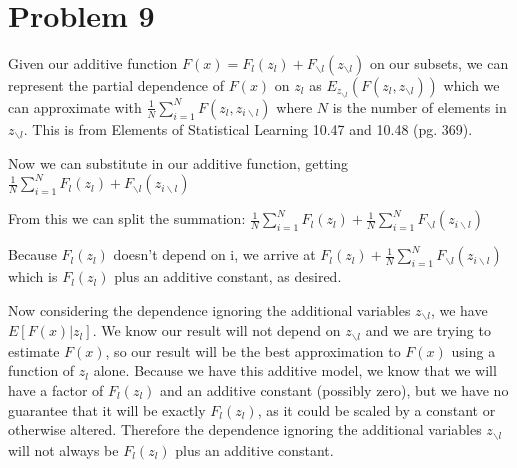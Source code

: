 \documentclass[11pt]{article}
\begin{document}
\begin{center}

\ \\
\end{center}


\section*{Problem 9}

\vspace{5 mm}
\noindent
Given our additive function $F(x) = F_{l}(z_{l}) + F_{\backslash l}(z_{\backslash l})$
 on our subsets, we can represent the partial dependence of $F(x)$ on $z_{l}$ as
  $E_{z_{\backslash l}}(F(z_{l}, z_{\backslash l}))$ which we can approximate with 
  $\frac{1}{N} \sum\limits_{i=1}^N F(z_{l}, z_{i\backslash l})$ where $N$ is the
   number of elements in $z_{\backslash l}$.  This is from Elements of Statistical
    Learning 10.47 and 10.48 (pg. 369).  

\noindent
Now we can substitute in our additive function, getting 
$\frac{1}{N} \sum\limits_{i=1}^N F_{l}(z_{l}) + F_{\backslash l}(z_{i\backslash l})$  

\noindent
From this we can split the summation: 
$\frac{1}{N} \sum\limits_{i=1}^N F_{l}(z_{l}) + \frac{1}{N} \sum\limits_{i=1}^N 
F_{\backslash l}(z_{i\backslash l})$ 

\noindent
Because $F_{l}(z_{l})$ doesn't depend on i, we arrive at $F_{l}(z_{l}) + \frac{1}{N}
 \sum\limits_{i=1}^N F_{\backslash l}(z_{i\backslash l})$ which is $F_{l}(z_{l})$ 
 plus an additive constant, as desired.

\vspace{5 mm}
\noindent
Now considering the dependence ignoring the additional variables $z_{\backslash l}$, 
we have $E[F(x)|z_{l}]$.  We know our result will not depend on $z_{\backslash l}$ 
and we are trying to estimate $F(x)$, so our result will be the best approximation 
to $F(x)$ using a function of $z_{l}$ alone.  Because we have this additive model, 
we know that we will have a factor of $F_{l}(z_{l})$ and an additive constant 
(possibly zero), but we have no guarantee that it will be exactly $F_{l}(z_{l})$, 
as it could be scaled by a constant or otherwise altered.  Therefore the dependence
 ignoring the additional variables $z_{\backslash l}$ will not always be $F_{l}(z_{l})$
 plus an additive constant.
\end{document}
